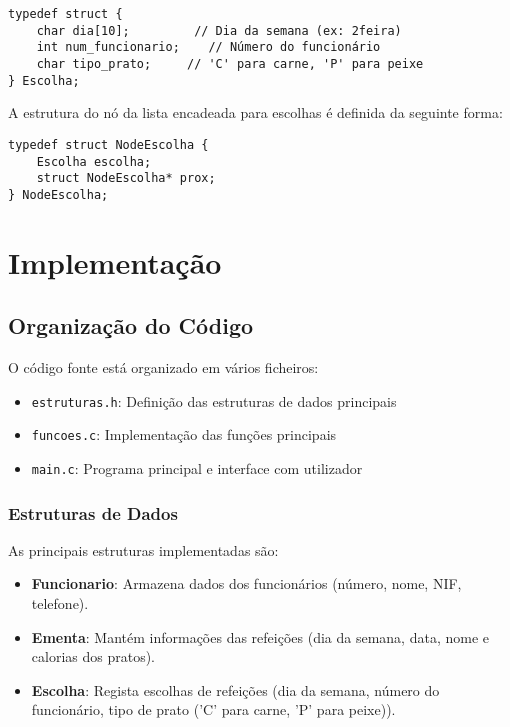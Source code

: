 \documentclass[a4paper,12pt]{report}
\begin{document}
\begin{lstlisting}[caption={Estrutura de dados para Escolhas},label=lst:escolha]
typedef struct {
    char dia[10];         // Dia da semana (ex: 2feira)
    int num_funcionario;    // Número do funcionário
    char tipo_prato;     // 'C' para carne, 'P' para peixe
} Escolha;
\end{lstlisting}
\noindent
A estrutura do nó da lista encadeada para escolhas é definida da seguinte forma:
\begin{lstlisting}[caption={Estrutura do Nó da Lista de Escolhas},label=lst:noEscolha]
typedef struct NodeEscolha {
    Escolha escolha;
    struct NodeEscolha* prox;
} NodeEscolha;
\end{lstlisting}

\chapter{Implementação}
\section{Organização do Código}
O código fonte está organizado em vários ficheiros:
\begin{itemize}
    \item \texttt{estruturas.h}: Definição das estruturas de dados principais
    \item \texttt{funcoes.c}: Implementação das funções principais
    \item \texttt{main.c}: Programa principal e interface com utilizador
\end{itemize}

\subsection{Estruturas de Dados}
As principais estruturas implementadas são:
\begin{itemize}
    \item \textbf{Funcionario}: Armazena dados dos funcionários (número, nome, NIF, telefone).
    \item \textbf{Ementa}: Mantém informações das refeições (dia da semana, data, nome e calorias dos pratos).
    \item \textbf{Escolha}: Regista escolhas de refeições (dia da semana, número do funcionário, tipo de prato ('C' para carne, 'P' para peixe)).
\end{itemize}
\end{document}
